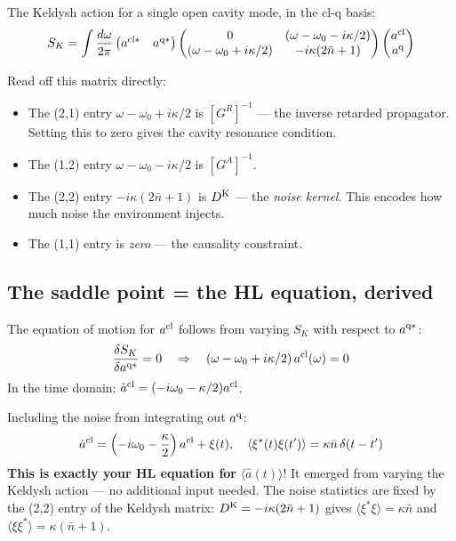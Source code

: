 \documentclass[12pt]{article}
\newcommand{\cl}{{\rm cl}}
\newcommand{\q}{{\rm q}}
\newcommand{\Keldysh}{{\rm K}}
\begin{document}
The Keldysh action for a single open cavity mode, in the cl-q basis:
\begin{equation}
  S_K = \int\frac{d\omega}{2\pi}
  \begin{pmatrix}a^{\cl*} & a^{\q*}\end{pmatrix}
  \begin{pmatrix}
    0 & (\omega-\omega_0-i\kappa/2)\\
    (\omega-\omega_0+i\kappa/2) & -i\kappa(2\bar{n}+1)
  \end{pmatrix}
  \begin{pmatrix}a^\cl\\a^\q\end{pmatrix}
  \label{eq:SK_tutorial}
\end{equation}

Read off this matrix directly:
\begin{itemize}
  \item The (2,1) entry $\omega-\omega_0+i\kappa/2$ is $[G^R]^{-1}$
    --- the inverse retarded propagator.  Setting this to zero gives
    the cavity resonance condition.
  \item The (1,2) entry $\omega-\omega_0-i\kappa/2$ is $[G^A]^{-1}$.
  \item The (2,2) entry $-i\kappa(2\bar{n}+1)$ is $D^\Keldysh$ ---
    the \emph{noise kernel}.  This encodes how much noise the environment
    injects.
  \item The (1,1) entry is \emph{zero} --- the causality constraint.
\end{itemize}

\subsection{The saddle point = the HL equation, derived}

The equation of motion for $a^\cl$ follows from varying $S_K$ with
respect to $a^{\q*}$:
\begin{equation}
  \frac{\delta S_K}{\delta a^{\q*}} = 0 \quad\Rightarrow\quad
  (\omega - \omega_0 + i\kappa/2)\,a^\cl(\omega) = 0
  \label{eq:saddle_tutorial}
\end{equation}
In the time domain: $\dot{a}^\cl = (-i\omega_0 - \kappa/2)a^\cl$.

Including the noise from integrating out $a^\q$:
\begin{equation}
  \dot{a}^\cl = \left(-i\omega_0 - \frac{\kappa}{2}\right)a^\cl + \xi(t),
  \quad
  \langle\xi^*(t)\xi(t')\rangle = \kappa\bar{n}\,\delta(t-t')
  \label{eq:HL_from_Keldysh}
\end{equation}
\textbf{This is exactly your HL equation for} $\langle\hat{a}(t)\rangle$!
It emerged from varying the Keldysh action --- no additional input needed.
The noise statistics are fixed by the (2,2) entry of the Keldysh matrix:
$D^\Keldysh = -i\kappa(2\bar{n}+1)$ gives $\langle\xi^*\xi\rangle = \kappa\bar{n}$
and $\langle\xi\xi^*\rangle = \kappa(\bar{n}+1)$.
\end{document}
